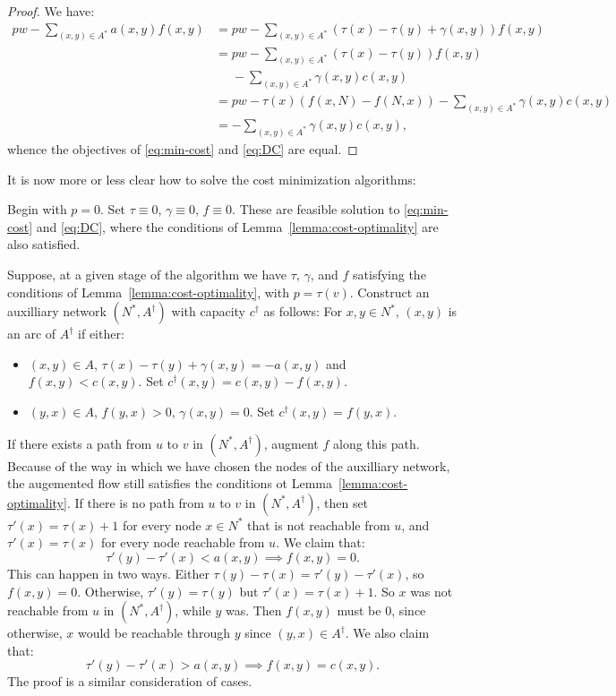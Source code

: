\documentclass{amsbook}
\theoremstyle{definition}
\theoremstyle{remark}
\begin{document}
\begin{proof}
  We have:
  \begin{align*}
    pw-\sum_{(x,y)\in A^*} a(x,y)f(x,y) & = pw-\sum_{(x,y)\in A^*} (\tau(x)-\tau(y)+\gamma(x,y))f(x,y)\\
                                        & = pw - \sum_{(x,y)\in A^*} (\tau(x)-\tau(y))f(x,y)\\&\phantom{=} - \sum_{(x,y)\in A^*} \gamma(x,y)c(x,y)\\
                                        & = pw - \tau(x)(f(x,N) - f(N,x)) - \sum_{(x,y)\in A^*}\gamma(x,y)c(x,y)\\
    & = -\sum_{(x,y)\in A^*}\gamma(x,y)c(x,y),
  \end{align*}
  whence the objectives of \eqref{eq:min-cost} and \eqref{eq:DC} are equal.
\end{proof}
It is now more or less clear how to solve the cost minimization algorithms:

Begin with $p=0$.
Set $\tau\equiv 0$, $\gamma\equiv 0$, $f\equiv 0$.
These are feasible solution to \eqref{eq:min-cost} and \eqref{eq:DC}, where the conditions of Lemma~\ref{lemma:cost-optimality} are also satisfied.

Suppose, at a given stage of the algorithm we have $\tau$, $\gamma$, and $f$ satisfying the conditions of Lemma~\ref{lemma:cost-optimality}, with $p=\tau(v)$.
Construct an auxilliary network $(N^*,A^\dagger)$ with capacity $c^\dagger$ as follows:
For $x,y\in N^*$, $(x,y)$ is an arc of $A^\dagger$ if either:
\begin{itemize}
\item $(x,y)\in A$, $\tau(x)-\tau(y)+\gamma(x,y)=-a(x,y)$ and $f(x,y)<c(x,y)$.
  Set $c^\dagger(x,y)=c(x,y)-f(x,y)$.
\item $(y,x)\in A$, $f(y,x)>0$, $\gamma(x,y)=0$.
  Set $c^\dagger(x,y)=f(y,x)$.
\end{itemize}
If there exists a path from $u$ to $v$ in $(N^*,A^\dagger)$, augment $f$ along this path.
Because of the way in which we have chosen the nodes of the auxilliary network, the augemented flow still satisfies the conditions ot Lemma~\ref{lemma:cost-optimality}.
If there is no path from $u$ to $v$ in $(N^*,A^\dagger)$, then set $\tau'(x)=\tau(x)+1$ for every node $x\in N^*$ that is not reachable from $u$, and $\tau'(x) = \tau(x)$ for every node reachable from $u$.
We claim that:
\begin{displaymath}
  \tau'(y)-\tau'(x)<a(x,y)\implies f(x,y)=0.
\end{displaymath}
This can happen in two ways.
Either $\tau(y)-\tau(x)=\tau'(y)-\tau'(x)$, so $f(x,y)=0$.
Otherwise, $\tau'(y)=\tau(y)$ but $\tau'(x)=\tau(x)+1$.
So $x$ was not reachable from $u$ in $(N^*,A^\dagger)$, while $y$ was.
Then $f(x,y)$ must be $0$, since otherwise, $x$ would be reachable through $y$ since $(y,x)\in A^\dagger$.
We also claim that:
\begin{displaymath}
  \tau'(y)-\tau'(x)>a(x,y) \implies f(x,y)=c(x,y).
\end{displaymath}
The proof is a similar consideration of cases.
\end{document}
